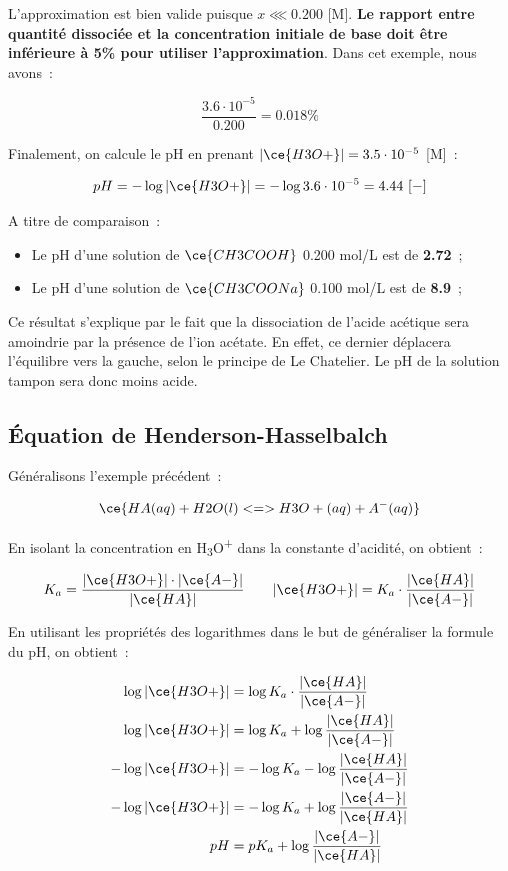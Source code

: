 \documentclass[
  11pt,
  french,
  a4paper,
  openany]{book}
\providecommand{\tightlist}{%
  \setlength{\itemsep}{0pt}\setlength{\parskip}{0pt}}
\begin{document}
L'approximation est bien valide puisque \(x \lll 0.200\) {[}M{]}. \textbf{Le rapport entre quantité dissociée et la concentration initiale de base doit être inférieure à 5\% pour utiliser l'approximation}. Dans cet exemple, nous avons~:

\[
\frac{3.6 \cdot 10^{-5}}{0.200} = 0.018\%
\]

Finalement, on calcule le pH en prenant \(|\ce{H3O+}| = 3.5 \cdot 10^{-5}\) {[}M{]}~:

\[
pH = - \log |\ce{H3O+}| = - \log 3.6 \cdot 10^{-5} = 4.44\ [-]
\]

A titre de comparaison~:

\begin{itemize}
\tightlist
\item
  Le pH d'une solution de \(\ce{CH3COOH}\) 0.200 mol/L est de \textbf{2.72}~;
\item
  Le pH d'une solution de \(\ce{CH3COONa}\) 0.100 mol/L est de \textbf{8.9}~;
\end{itemize}

Ce résultat s'explique par le fait que la dissociation de l'acide acétique sera amoindrie par la présence de l'ion acétate. En effet, ce dernier déplacera l'équilibre vers la gauche, selon le principe de Le Chatelier. Le pH de la solution tampon sera donc moins acide.

\hypertarget{uxe9quation-de-henderson-hasselbalch}{%
\subsection{Équation de Henderson-Hasselbalch}\label{uxe9quation-de-henderson-hasselbalch}}

Généralisons l'exemple précédent~:

\[
\ce{HA(aq) + H2O(l) <=> H3O+(aq) + A^{-}(aq)}
\]

En isolant la concentration en H\textsubscript{3}O\textsuperscript{+} dans la constante d'acidité, on obtient~:

\[
\begin{split}
K_a = \frac{|\ce{H3O+}| \cdot |\ce{A-}|}{|\ce{HA}|}
\end{split}
\qquad
\begin{split}
|\ce{H3O+}| = K_a \cdot \frac{|\ce{HA}|}{|\ce{A-}|}
\end{split}
\]

En utilisant les propriétés des logarithmes dans le but de généraliser la formule du pH, on obtient~:

\[
\begin{split}
\log |\ce{H3O+}| &= \log K_a \cdot \frac{|\ce{HA}|}{|\ce{A-}|} \\
\log |\ce{H3O+}| &= \log K_a + \log \frac{|\ce{HA}|}{|\ce{A-}|} \\
- \log |\ce{H3O+}| &= - \log K_a - \log \frac{|\ce{HA}|}{|\ce{A-}|} \\
- \log |\ce{H3O+}| &= - \log K_a + \log \frac{|\ce{A-}|}{|\ce{HA}|} \\
pH &= pK_a + \log \frac{|\ce{A-}|}{|\ce{HA}|}
\end{split}
\]
\end{document}
